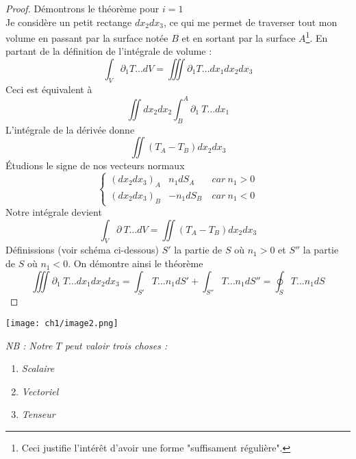     \begin{proof}
    Démontrons le théorème pour $i=1$\\
    Je considère un petit rectange $dx_2dx_3$, ce qui me permet de traverser tout mon volume en passant
    par la surface notée $B$ et en sortant par la surface $A$\footnote{Ceci justifie l'intérêt d'avoir
    une forme "suffisament régulière".}. En partant de la définition de l'intégrale de volume :
    \begin{equation}
    \int_V \partial_1 T\dots dV = \iiint \partial_1 T\dots dx_1dx_2dx_3
    \end{equation}
    Ceci est équivalent à
    \begin{equation}
    \iint dx_2dx_2\int_B^A \partial_1\ T\dots dx_1
    \end{equation}
    L'intégrale de la dérivée donne
    \begin{equation}
    \iint (T_A-T_B)dx_2dx_3
    \end{equation}
    Étudions le signe de nos vecteurs normaux
    \begin{equation}
    \left\{\begin{array}{lll}
     (dx_2dx_3)_A & n_1dS_A &\ car\ n_1>0  \\
     (dx_2dx_3)_B & -n_1dS_B &\ car\ n_1<0 
    \end{array}\right.
    \end{equation}
    Notre intégrale devient
    \begin{equation}
    \int_V \partial\ T\dots dV = \iint (T_A-T_B)dx_2dx_3
    \end{equation}
    Définissions (voir schéma ci-dessous) $S'$ la partie de $S$ où $n_1>0$ et $S''$ la partie de $S$ où
    $n_1<0$. On démontre ainsi le théorème
    \begin{equation}
    \iiint \partial_1\ T\dots dx_1dx_2dx_3 = \int_{S'} T\dots n_1 dS' + \int_{S''} T\dots n_1 dS'' =
    \oint_S T\dots n_1 dS
    \end{equation}
    
    \end{proof}
    \begin{center}
    \texttt{[image: ch1/image2.png]}
    \end{center}
   
   	\textit{NB : Notre $T$ peut valoir trois choses :} 
   	\begin{enumerate}
   	\item \textit{Scalaire}
   	\item \textit{Vectoriel}
   	\item \textit{Tenseur}
   	\end{enumerate}
   	
